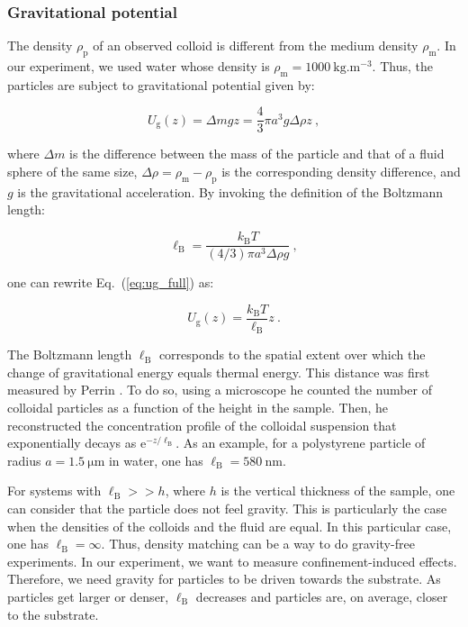 \subsubsection{Gravitational potential}
\label{sec:gravit}


The density $\rho_\mathrm{p}$ of an observed colloid is different from the medium density $\rho_\mathrm{m}$. In our experiment, we used water whose density is $\rho_\mathrm{m} = 1000 ~ \mathrm{kg.m^{-3}}$. Thus, the particles are subject to gravitational potential given by:

\begin{equation}
	U_\mathrm{g} (z) = \Delta m g z = \frac{4}{3}\pi a ^3 g \Delta \rho z ~,
	\label{eq:ug_full}
\end{equation}

where $\Delta m$ is the difference between the mass of the particle and that of a fluid sphere of the same size, $\Delta \rho = \rho_\mathrm{m} - \rho_\mathrm{p}$ is the corresponding density difference, and $g$ is the gravitational acceleration. By invoking the definition of the Boltzmann length:

\begin{equation}
	\ell _\mathrm{B} = \frac{k_\mathrm{B}T}{(4/3) \pi a ^3 \Delta \rho g } ~,
\end{equation}

one can rewrite Eq.~(\ref{eq:ug_full}) as:

\begin{equation}
	U_\mathrm{g}(z) = \frac{k_\mathrm{B}T}{\ell _\mathrm{B}}z ~.
	\label{eq:ug}
\end{equation}

The Boltzmann length $\ell_\mathrm{B}$ corresponds to the spatial extent over which the change of gravitational energy equals thermal energy. This distance was first measured by Perrin \cite{perrin_les_2014}. To do so, using a microscope he counted the number of colloidal particles as a function of the height in the sample. Then, he reconstructed the concentration profile of the colloidal suspension that exponentially decays as $\mathrm{e}^{- z / \ell _\mathrm{B}}$. As an example, for a polystyrene particle of radius $a  = 1.5 ~ \mathrm{\mu m}$ in water, one has $\ell _\mathrm{B} = 580 ~ \mathrm{nm}$.

For systems with $\ell _\mathrm{B} >> h $, where $h$ is the vertical thickness of the sample, one can consider that the particle does not feel gravity. This is particularly the case when the densities of the colloids and the fluid are equal. In this particular case, one has $\ell _\mathrm{B} = \infty$. Thus, density matching can be a way to do gravity-free experiments. In our experiment, we want to measure confinement-induced effects. Therefore, we need gravity for particles to be driven towards the substrate. As particles get larger or denser, $\ell _\mathrm{B}$ decreases and particles are, on average, closer to the substrate. 


